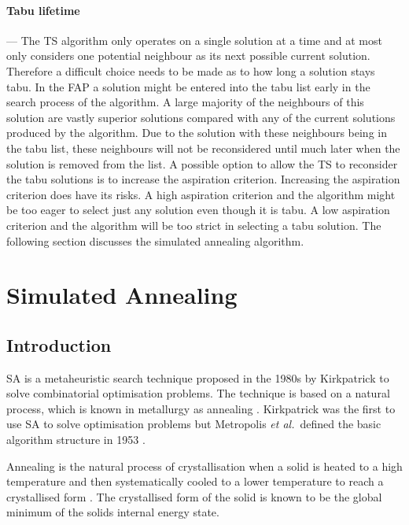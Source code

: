 \paragraph{Tabu lifetime}
--- The \gls{TS} algorithm only operates on a single solution at a time and at most only considers one potential neighbour as its next possible current solution. Therefore a difficult choice needs to be made as to how long a solution stays tabu. In the \gls{FAP} a solution might be entered into the tabu list early in the search process of the algorithm. A large majority of the neighbours of this solution are vastly superior solutions compared with any of the current solutions produced by the algorithm. Due to the solution with these neighbours being in the tabu list, these neighbours will not be reconsidered until much later when the solution is removed from the list. A possible option to allow the \gls{TS} to reconsider the tabu solutions is to increase the aspiration criterion. Increasing the aspiration criterion does have its risks. A high aspiration criterion and the algorithm might be too eager to select just any solution even though it is tabu. A low aspiration criterion and the algorithm will be too strict in selecting a tabu solution. The following section discusses the simulated annealing algorithm.
\section{Simulated Annealing}
\label{sec:simulatedannealing}

\subsection{Introduction}
\label{sec:SAIntroduction}
\Gls{SA} is a metaheuristic search technique proposed in the 1980s by Kirkpatrick to solve combinatorial optimisation problems. The technique is based on a natural process, which is known in metallurgy as annealing \cite{SASingleMultiObj,TempCyclingSA}. Kirkpatrick was the first to use \gls{SA} to solve optimisation problems but Metropolis \emph{et al.}\ defined the basic algorithm structure in 1953 \cite{CurveFittingSA,VeryFastSAImageEnchancement}.

Annealing is the natural process of crystallisation when a solid is heated to a high temperature and then systematically cooled to a lower temperature to reach a crystallised form \cite{NewSAs,ConstantTempSA}. The crystallised form of the solid is known to be the global minimum of the solids internal energy state. 

